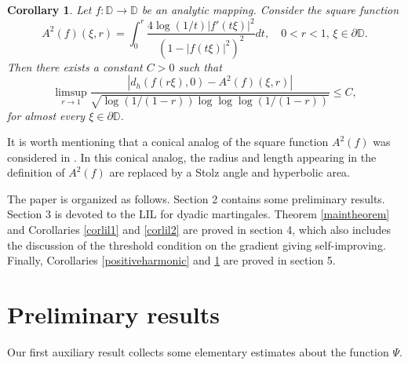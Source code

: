 \documentclass[11pt,letterpaper]{amsart}
\newtheorem{cor}{Corollary}[section]
\theoremstyle{definition}
\numberwithin{equation}{section}
\newcommand{\D}{\mathbb D}
\begin{document}
\begin{cor}
    \label{analyticselfmappings}
    Let $f:\D \rightarrow \D$ be an analytic mapping. Consider the square function
    $$
    A^2 (f) (\xi , r) = \int_0^r \frac{4\log(1/t) |f' (t \xi)|^2}{(1 - |f(t \xi)|^2)^2} dt, \quad 0<r<1, \, \xi \in \partial \D .
    $$
    Then there exists a constant $C >0$ such that
\begin{equation*}
        \limsup_{r \to 1 } \frac{|d_h (f(r \xi), 0) - A^2 (f) (\xi,r)|}{\sqrt{\log(1/(1-r)) \log \log \log (1/(1-r))}} \leq C,
    \end{equation*}
for almost every $\xi \in \partial \D$. 
    
\end{cor}

It is worth mentioning that a conical analog of the square function $A^2(f)$ was considered in \cite{GN}. In this conical analog, the radius and length appearing in the definition of $A^2(f)$ are replaced by a Stolz angle and hyperbolic area. 

The paper is organized as follows. Section 2 contains some preliminary results. Section 3 is devoted to the LIL for dyadic martingales. Theorem \ref{maintheorem} and Corollaries \ref{corlil1} and \ref{corlil2} are proved in section 4, which also includes the discussion of the threshold condition on the gradient giving self-improving. Finally, Corollaries \ref{positiveharmonic} and \ref{analyticselfmappings} are proved in section 5.





\section{Preliminary results}

Our first auxiliary result collects some elementary estimates about the function $\Psi$.
\end{document}

